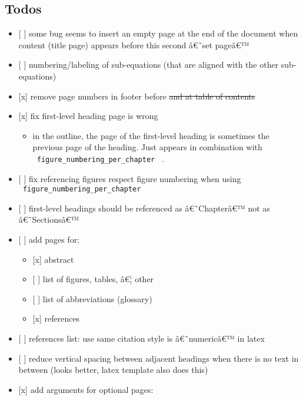 \subsection{Todos}\label{todos}

\begin{itemize}
\tightlist
\item
  {[} {]} some bug seems to insert an empty page at the end of the
  document when content (title page) appears before this second â€˜set
  pageâ€™
\item
  {[} {]} numbering/labeling of sub-equations (that are aligned with the
  other sub-equations)
\item
  {[}x{]} remove page numbers in footer before \st{and at table of
  contents}
\item
  {[}x{]} fix first-level heading page is wrong

  \begin{itemize}
  \tightlist
  \item
    in the outline, the page of the first-level heading is sometimes the
    previous page of the heading. Just appears in combination with
    \texttt{\ figure\_numbering\_per\_chapter\ } .
  \end{itemize}
\item
  {[} {]} fix referencing figures respect figure numbering when using
  \texttt{\ figure\_numbering\_per\_chapter\ }
\item
  {[} {]} first-level headings should be referenced as â€˜Chapterâ€™ not
  as â€˜Sectionsâ€™
\item
  {[} {]} add pages for:

  \begin{itemize}
  \tightlist
  \item
    {[}x{]} abstract
  \item
    {[} {]} list of figures, tables, â€¦ other
  \item
    {[} {]} list of abbreviations (glossary)
  \item
    {[}x{]} references
  \end{itemize}
\item
  {[} {]} references list: use same citation style is â€˜numericâ€™ in
  latex
\item
  {[} {]} reduce vertical spacing between adjacent headings when there
  is no text in between (looks better, latex template also does this)
\item
  {[}x{]} add arguments for optional pages:


\end{itemize}
